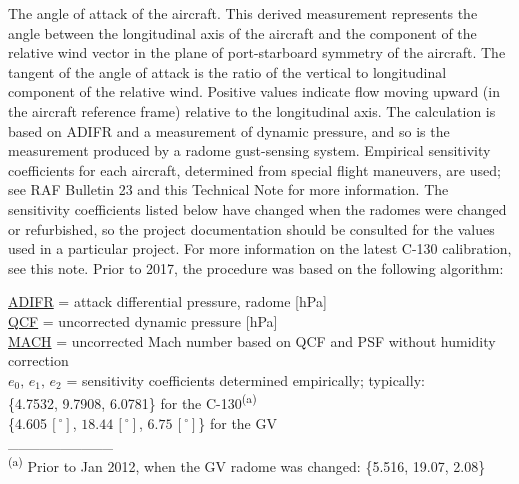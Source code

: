 \documentclass[
  english,
]{book}
\begin{document}
The angle of attack of the aircraft. This derived measurement represents the angle between the longitudinal axis of the aircraft and the component of the relative wind vector in the plane of port-starboard symmetry of the aircraft. The tangent of the angle of attack is the ratio of the vertical to longitudinal component of the relative wind. Positive values indicate flow moving upward (in the aircraft reference frame) relative to the longitudinal axis. The calculation is based on ADIFR and a measurement of dynamic pressure, and so is the measurement produced by a radome gust-sensing system. Empirical sensitivity coefficients for each aircraft, determined from special flight maneuvers, are used; see RAF Bulletin 23 and this Technical Note for more information. The sensitivity coefficients listed below have changed when the radomes were changed or refurbished, so the project documentation should be consulted for the values used in a particular project. For more information on the latest C-130 calibration, see this note.
Prior to 2017, the procedure was based on the following algorithm:

\protect\hyperlink{adifr}{ADIFR} = attack differential pressure, radome {[}hPa{]}\\
\protect\hyperlink{qcx}{QCF} = uncorrected dynamic pressure {[}hPa{]}\\
\protect\hyperlink{mach-number}{MACH} = uncorrected Mach number based on QCF and PSF
without humidity correction\\
\(e_{0},\,e{}_{1},\,e_{2}\) = sensitivity
coefficients determined empirically; typically:\\
\hspace*{0.333em}\hspace*{0.333em}\hspace*{0.333em}\hspace*{0.333em}\hspace*{0.333em}\{4.7532, 9.7908, 6.0781\} for the C-130\textsuperscript{(a)}\\
\hspace*{0.333em}\hspace*{0.333em}\hspace*{0.333em}\hspace*{0.333em}\hspace*{0.333em}\{4.605\(\,[^{\circ}]\), \(18.44\,[^{\circ}]\), \(6.75\,[^{\circ}]\)\}
for the GV\\
\_\_\_\_\_\_\_\_\_\_\\
\textsuperscript{(a)} Prior to Jan 2012, when the GV radome was changed: \{5.516, 19.07, 2.08\}
\end{document}
